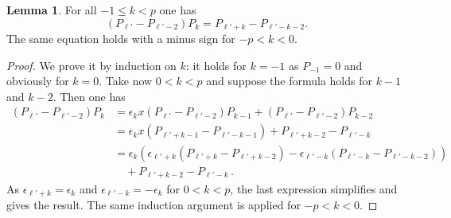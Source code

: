 \documentclass{amsart}
\theoremstyle{definition}
\newtheorem{Lemma}[Theorem]{Lemma}
\begin{document}
\begin{Lemma}\label{sumoftwo}
For all $-1\le k<p$ one has $$(P_{\ell'}-P_{\ell'-2}) P_k=P_{\ell'+k}-P_{\ell'-k-2}.$$ The same equation holds with a minus sign for $-p <k<0$. 
\end{Lemma}
\begin{proof}
We prove it by induction on $k$: it holds for $k=-1$ as $P_{-1}=0$ and obviously for $k=0$.
Take now $0<k<p$ and suppose the formula holds for $k-1$ and $k-2$. Then one has 
\begin{align*}
(P_{\ell'}-P_{\ell'-2})P_k&=\epsilon_kx(P_{\ell'}-P_{\ell'-2})P_{k-1}+(P_{\ell'}-P_{\ell'-2})P_{k-2}\\
&= \epsilon_k x(P_{\ell'+k-1}-P_{\ell'-k-1})+P_{\ell'+k-2}-P_{\ell'-k}\\
&= \epsilon_k(\epsilon_{\ell'+k}(P_{\ell'+k}-P_{\ell'+k-2})-\epsilon_{\ell'-k}(P_{\ell'-k}-P_{\ell'-k-2}))\\
&\quad +P_{\ell'+k-2}-P_{\ell'-k}\,.
\end{align*}
As $\epsilon_{\ell'+k}=\epsilon_k$ and $\epsilon_{\ell'-k}=-\epsilon_k$ for $0< k<p$, the last expression simplifies and gives the result.  The same induction argument is applied for $-p<k<0$.
\end{proof}
\end{document}
